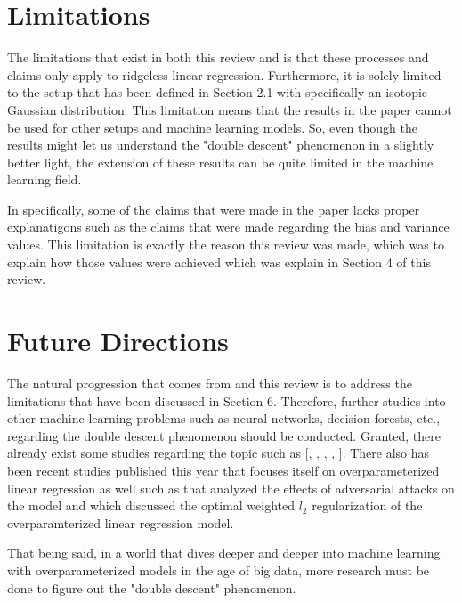 \documentclass{article}
\begin{document}
\section{Limitations}

The limitations that exist in both this review and \cite{Nakkiran_2019} is that these processes and claims only apply to ridgeless linear regression. Furthermore, it is solely limited to the setup that has been defined in Section 2.1 with specifically an isotopic Gaussian distribution. This limitation means that the results in the \cite{Nakkiran_2019} paper cannot be used for other setups and machine learning models. So, even though the results might let us understand the "double descent" phenomenon in a slightly better light, the extension of these results can be quite limited in the machine learning field.

In \cite{Nakkiran_2019} specifically, some of the claims that were made in the paper lacks proper explanatigons such as the claims that were made regarding the bias and variance values. This limitation is exactly the reason this review was made, which was to explain how those values were achieved which was explain in Section 4 of this review.

\section{Future Directions}

The natural progression that comes from \cite{Nakkiran_2019} and this review is to address the limitations that have been discussed in Section 6. Therefore, further studies into other machine learning problems such as neural networks, decision forests, etc., regarding the double descent phenomenon should be conducted. Granted, there already exist some studies regarding the topic such as [\cite{Nakkiran_2021}, \cite{Hastie_2022}, \cite{Belkin_2019}, \cite{Spigler_2019}, \cite{Geiger_2019}]. There also has been recent studies published this year that focuses itself on overparameterized linear regression as well such as \cite{Ribeiro_2023} that analyzed the effects of adversarial attacks on the model and \cite{Wu_2020} which discussed the optimal weighted $l_2$ regularization of the overparamterized linear regression model.

That being said, in a world that dives deeper and deeper into machine learning with overparameterized models in the age of big data, more research must be done to figure out the "double descent" phenomenon.

\newpage



\end{document}
